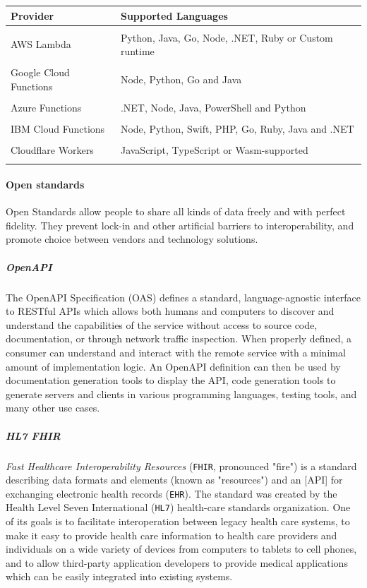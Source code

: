 \documentclass[10pt]{article}
\begin{document}
\begin{center}
\begin{tabular}{ p{5cm} p{5cm} }
	\toprule
	Provider & Supported Languages \\
	\midrule
	&\\
	AWS Lambda   & Python, Java, Go, Node, .NET, Ruby or Custom runtime  \\
	&\\
	Google Cloud Functions & Node, Python, Go and Java \\
	&\\
	Azure Functions & .NET, Node, Java, PowerShell and Python \\
	&\\
	IBM Cloud Functions & Node, Python, Swift, PHP, Go, Ruby, Java and .NET \\
	&\\
	Cloudflare Workers & JavaScript, TypeScript or Wasm-supported \\
	&\\
	\midrule
\end{tabular}
\end{center}

\paragraph{Open standards}
Open Standards allow people to share all kinds of data freely and with perfect fidelity. They prevent lock-in and other artificial barriers to interoperability, and promote choice between vendors and technology solutions. \cite{openstandards}

\subparagraph{OpenAPI}
The OpenAPI Specification (OAS) defines a standard, language-agnostic interface to RESTful APIs which allows both humans and computers to discover and understand the capabilities of the service without access to source code, documentation, or through network traffic inspection. When properly defined, a consumer can understand and interact with the remote service with a minimal amount of implementation logic. An OpenAPI definition can then be used by documentation generation tools to display the API, code generation tools to generate servers and clients in various programming languages, testing tools, and many other use cases. \cite{openapi}

\subparagraph{HL7 FHIR}
\textit{Fast Healthcare Interoperability Resources} (\texttt{FHIR}, pronounced "fire") is a standard describing data formats and elements (known as "resources") and an [API] for exchanging electronic health records (\texttt{EHR}). The standard was created by the Health Level Seven International (\texttt{HL7}) health-care standards organization. One of its goals is to facilitate interoperation between legacy health care systems, to make it easy to provide health care information to health care providers and individuals on a wide variety of devices from computers to tablets to cell phones, and to allow third-party application developers to provide medical applications which can be easily integrated into existing systems. \cite{fhir}
\end{document}
